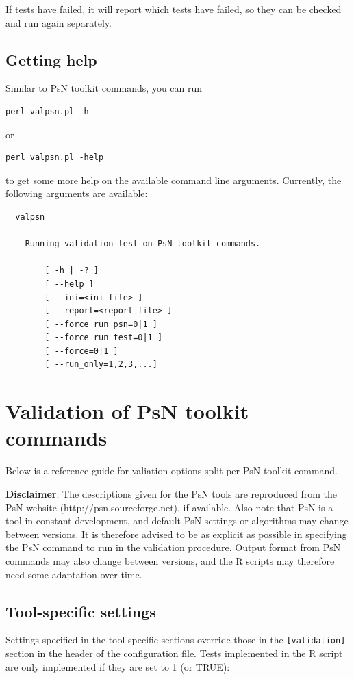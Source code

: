 \documentclass[a4,11pt]{report} \usepackage[pdftex]{graphicx}
\begin{document}
\noindent If tests have failed, it will report which tests have
failed, so they can be checked and run again separately.

\subsection{Getting help}
\noindent Similar to PsN toolkit commands, you can
run 
\begin{lstlisting}
perl valpsn.pl -h
\end{lstlisting}
or 
\begin{lstlisting}
perl valpsn.pl -help
\end{lstlisting} 
\noindent to get some more help on the available command line
arguments. Currently, the following arguments are available:

\begin{lstlisting}
  valpsn

    Running validation test on PsN toolkit commands.

        [ -h | -? ]
        [ --help ]
        [ --ini=<ini-file> ]
        [ --report=<report-file> ]
        [ --force_run_psn=0|1 ]
        [ --force_run_test=0|1 ]
        [ --force=0|1 ]
        [ --run_only=1,2,3,...]

\end{lstlisting}

\newpage

\section{Validation of PsN toolkit commands}

Below is a reference guide for valiation options split per PsN toolkit
command.

\vspace{10pt}

\noindent \textbf{Disclaimer}: The descriptions given for the PsN
tools are reproduced from the PsN website
(http://psn.sourceforge.net), if available. Also note that PsN is a
tool in constant development, and default PsN settings or algorithms may change
between versions. It is therefore advised to be as explicit as
possible in specifying the PsN command to run in the
validation procedure. Output format from PsN commands may also change between
versions, and the R scripts may therefore need some adaptation over
time.

\subsection{Tool-specific settings}
Settings specified in the tool-specific sections override those in the
{\tt [validation]} section in the header of the configuration
file. Tests implemented in the R script are only implemented if they
are set to 1 (or TRUE):
\end{document}
